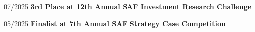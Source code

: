 \begin{twocolentry}{07/2025}
    \textbf{3rd Place at 12th Annual SAF Investment Research Challenge}
\end{twocolentry}
\vspace{0.1 cm}
\begin{twocolentry}{05/2025}
    \textbf{Finalist at 7th Annual SAF Strategy Case Competition}
\end{twocolentry}


